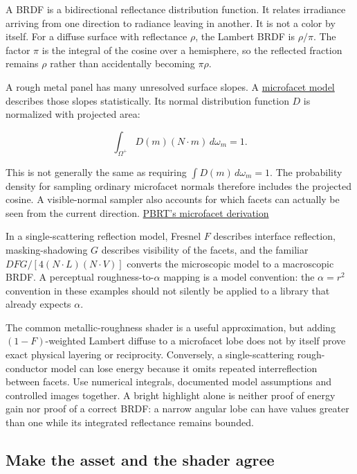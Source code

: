 A BRDF is a bidirectional reflectance distribution function. It relates irradiance arriving from one direction to radiance leaving in another. It is not a color by itself. For a diffuse surface with reflectance \(\rho\), the Lambert BRDF is \(\rho/\pi\). The factor \(\pi\) is the integral of the cosine over a hemisphere, so the reflected fraction remains \(\rho\) rather than accidentally becoming \(\pi\rho\).

A rough metal panel has many unresolved surface slopes. A \hyperref[appendix-885c1cb64ae9]{microfacet model} describes those slopes statistically. Its normal distribution function \(D\) is normalized with projected area:

\[
\int_{\Omega^+} D(m)(N\cdot m)\,d\omega_m=1.
\]

This is not generally the same as requiring \(\int D(m)\,d\omega_m=1\). The probability density for sampling ordinary microfacet normals therefore includes the projected cosine. A visible-normal sampler also accounts for which facets can actually be seen from the current direction. \href{https://pbr-book.org/4ed/Reflection_Models/Roughness_Using_Microfacet_Theory}{PBRT's microfacet derivation}

In a single-scattering reflection model, Fresnel \(F\) describes interface reflection, masking-shadowing \(G\) describes visibility of the facets, and the familiar \(DFG/[4(N\cdot L)(N\cdot V)]\) converts the microscopic model to a macroscopic BRDF. A perceptual roughness-to-\(\alpha\) mapping is a model convention: the \(\alpha=r^2\) convention in these examples should not silently be applied to a library that already expects \(\alpha\).

The common metallic-roughness shader is a useful approximation, but adding \((1-F)\)-weighted Lambert diffuse to a microfacet lobe does not by itself prove exact physical layering or reciprocity. Conversely, a single-scattering rough-conductor model can lose energy because it omits repeated interreflection between facets. Use numerical integrals, documented model assumptions and controlled images together. A bright highlight alone is neither proof of energy gain nor proof of a correct BRDF: a narrow angular lobe can have values greater than one while its integrated reflectance remains bounded.

\subsection{Make the asset and the shader agree}\label{03-visual-computing-i-ch005-make-the-asset-and-the-shader-agree}

